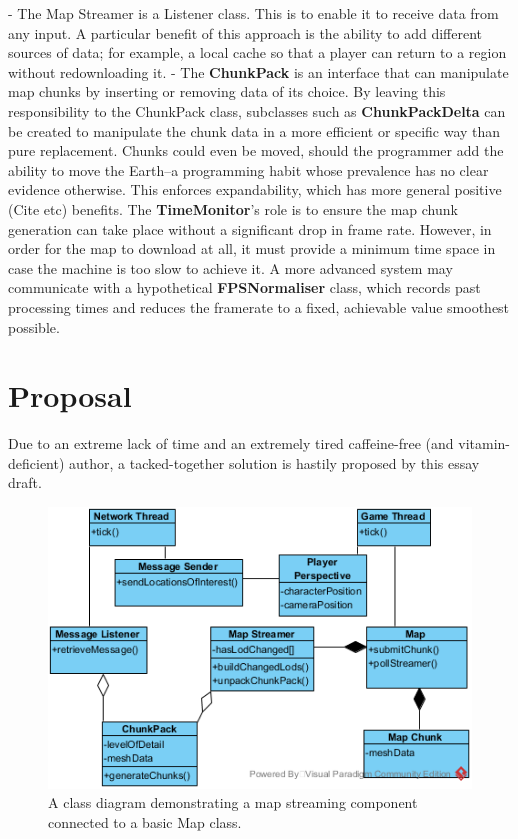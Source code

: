 \documentclass{scrartcl}
\begin{document}
- The Map Streamer is a Listener class. This is to enable it to receive data from any input. A particular benefit of this approach is the ability to add different sources of data; for example, a local cache so that a player can return to a region without redownloading it.
- The \textbf{ChunkPack} is an interface that can manipulate map chunks by inserting or removing data of its choice. By leaving this responsibility to the ChunkPack class, subclasses such as \textbf{ChunkPackDelta} can be created to manipulate the chunk data in a more efficient or specific way than pure replacement. Chunks could even be moved, should the programmer add the ability to move the Earth--a programming habit whose prevalence has no clear evidence otherwise. This enforces expandability, which has more general positive (Cite etc) benefits.
The \textbf{TimeMonitor}'s role is to ensure the map chunk generation can take place without a significant drop in frame rate. However, in order for the map to download at all, it must provide a minimum time space in case the machine is too slow to achieve it. A more advanced system may communicate with a hypothetical \textbf{FPSNormaliser} class, which records past processing times and reduces the framerate to a fixed, achievable value smoothest possible.


\section{Proposal}
Due to an extreme lack of time and an extremely tired caffeine-free (and vitamin-deficient) author, a tacked-together solution is hastily proposed by this essay draft.

\begin{figure}[H]
	\includegraphics[width=0.7\linewidth]{Basic_Map_Streamer}
	\caption{A class diagram demonstrating a map streaming component connected to a basic Map class.}
	\label{fig:simplesystem}
\end{figure}
\end{document}
